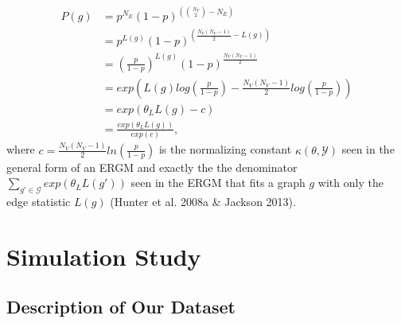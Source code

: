 \documentclass[12pt,twoside]{amherstthesis}
\begin{document}
  \[
  \begin{aligned}
  P(g) &= p^{N_E}(1 - p)^{\left({N_V \choose 2} - N_E \right)} \\
  &= p^{L(g)}(1 - p)^{\left(\frac {N_{V}(N_{V} - 1)} {2} - L(g) \right)} \\
  &= \left( \frac {p} {1-p} \right)^{L(g)}(1 - p)^{\frac {N_{V}(N_{V} - 1)} {2}} \\
  &= exp \left(L(g)log \left(\frac {p} {1-p} \right) - \frac {N_{V}(N_{V} - 1)} {2} log \left( \frac {p} {1-p} \right) \right) \\
  &= exp(\theta_{L}L(g) - c) \\
  &= \frac {exp(\theta_{L}L(g))} {exp(c)},
  \end{aligned} 
  \] where
  \(c = \frac {N_{V}(N_{V} - 1)} {2} ln \left( \frac {p} {1-p} \right)\)
  is the normalizing constant \(\kappa(\theta, \mathcal{Y})\) seen in the
  general form of an ERGM and exactly the the denominator
  \(\sum_{g' \in \mathcal{G}}^{} exp(\theta_{L}L(g'))\) seen in the ERGM
  that fits a graph \(g\) with only the edge statistic \(L(g)\) (Hunter et
  al. 2008a \& Jackson 2013).
  
  \chapter{Simulation Study}\label{simulation-study}
  
  \section{Description of Our Dataset}\label{description-of-our-dataset}
  
\end{document}
